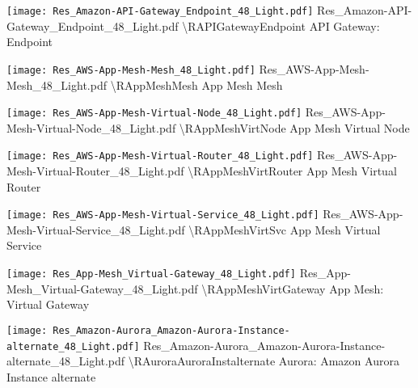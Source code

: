 \resStart
{} {\texttt{[image: Res\_Amazon-API-Gateway\_Endpoint\_48\_Light.pdf]}} {Res\_Amazon-API-Gateway\_Endpoint\_48\_Light.pdf} {{\textbackslash}RAPIGatewayEndpoint} {API Gateway: Endpoint}

 {\texttt{[image: Res\_AWS-App-Mesh-Mesh\_48\_Light.pdf]}} {Res\_AWS-App-Mesh-Mesh\_48\_Light.pdf} {{\textbackslash}RAppMeshMesh} {App Mesh Mesh}

 {\texttt{[image: Res\_AWS-App-Mesh-Virtual-Node\_48\_Light.pdf]}} {Res\_AWS-App-Mesh-Virtual-Node\_48\_Light.pdf} {{\textbackslash}RAppMeshVirtNode} {App Mesh Virtual Node}

 {\texttt{[image: Res\_AWS-App-Mesh-Virtual-Router\_48\_Light.pdf]}} {Res\_AWS-App-Mesh-Virtual-Router\_48\_Light.pdf} {{\textbackslash}RAppMeshVirtRouter} {App Mesh Virtual Router}

 {\texttt{[image: Res\_AWS-App-Mesh-Virtual-Service\_48\_Light.pdf]}} {Res\_AWS-App-Mesh-Virtual-Service\_48\_Light.pdf} {{\textbackslash}RAppMeshVirtSvc} {App Mesh Virtual Service}

 {\texttt{[image: Res\_App-Mesh\_Virtual-Gateway\_48\_Light.pdf]}} {Res\_App-Mesh\_Virtual-Gateway\_48\_Light.pdf} {{\textbackslash}RAppMeshVirtGateway} {App Mesh: Virtual Gateway}

 {\texttt{[image: Res\_Amazon-Aurora\_Amazon-Aurora-Instance-alternate\_48\_Light.pdf]}} {Res\_Amazon-Aurora\_Amazon-Aurora-Instance-alternate\_48\_Light.pdf} {{\textbackslash}RAuroraAuroraInstalternate} {Aurora: Amazon Aurora Instance alternate}

